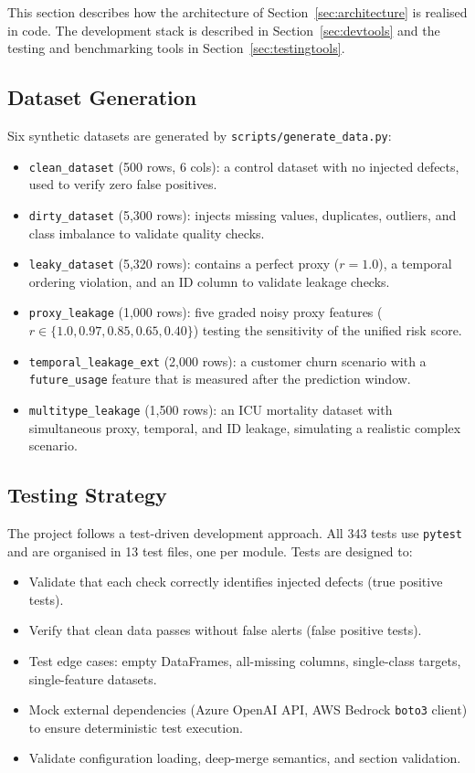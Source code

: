 \documentclass[12pt,a4paper]{report}
\begin{document}
This section describes how the architecture of Section~\ref{sec:architecture} is realised
in code.  The development stack is described in Section~\ref{sec:devtools} and the testing
and benchmarking tools in Section~\ref{sec:testingtools}.

\subsection{Dataset Generation}

Six synthetic datasets are generated by \texttt{scripts/generate\_data.py}:

\begin{itemize}[leftmargin=1.5em]
\item \texttt{clean\_dataset} (500 rows, 6 cols): a control dataset with no injected defects,
  used to verify zero false positives.
\item \texttt{dirty\_dataset} (5,300 rows): injects missing values, duplicates, outliers, and
  class imbalance to validate quality checks.
\item \texttt{leaky\_dataset} (5,320 rows): contains a perfect proxy ($r{=}1.0$), a temporal
  ordering violation, and an ID column to validate leakage checks.
\item \texttt{proxy\_leakage} (1,000 rows): five graded noisy proxy features
  ($r \in \{1.0, 0.97, 0.85, 0.65, 0.40\}$) testing the sensitivity of the unified risk score.
\item \texttt{temporal\_leakage\_ext} (2,000 rows): a customer churn scenario with a
  \texttt{future\_usage} feature that is measured after the prediction window.
\item \texttt{multitype\_leakage} (1,500 rows): an ICU mortality dataset with simultaneous
  proxy, temporal, and ID leakage, simulating a realistic complex scenario.
\end{itemize}

\subsection{Testing Strategy}

The project follows a test-driven development approach.  All 343 tests use \texttt{pytest}
and are organised in 13 test files, one per module.  Tests are designed to:
\begin{itemize}[leftmargin=1.5em]
\item Validate that each check correctly identifies injected defects (true positive tests).
\item Verify that clean data passes without false alerts (false positive tests).
\item Test edge cases: empty DataFrames, all-missing columns, single-class targets,
  single-feature datasets.
\item Mock external dependencies (Azure OpenAI API, AWS Bedrock \texttt{boto3} client) to
  ensure deterministic test execution.
\item Validate configuration loading, deep-merge semantics, and section validation.
\end{itemize}
\end{document}
